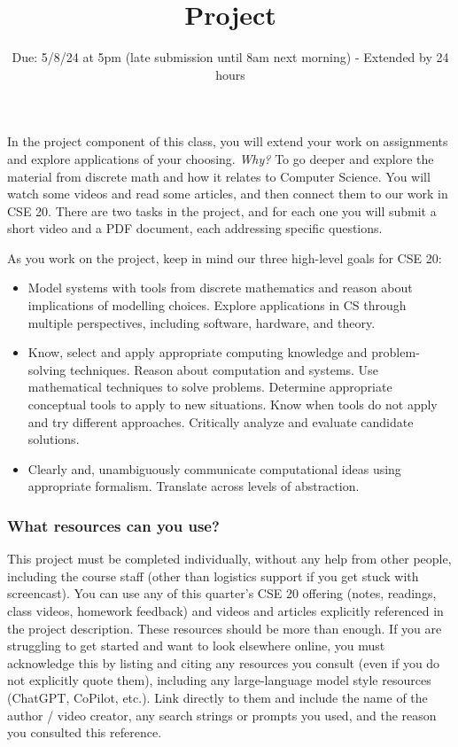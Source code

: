 \documentclass[12pt, oneside]{article}
\begin{document}
\newpage

\setlength{\parindent}{0em}
\setlength{\parskip}{0em}

\title{Project}
\date{Due: 5/8/24 at 5pm (late submission until 8am next morning) - Extended by 24 hours}


\maketitle
\thispagestyle{fancy}

\vspace{-20pt}

In the project component of this class, you will extend your 
work on assignments and explore applications of your choosing. 
{\it Why?}
To go deeper and explore the material from discrete math and how it relates to Computer Science.
You will watch some videos and read some articles, and then connect them to our work in CSE 20. There 
are two tasks in the project, and for each one you will submit a short video and a PDF document, each 
addressing specific questions.


As you work on the project, keep in mind our three high-level goals for CSE 20:
\begin{itemize}
\item Model systems with tools from discrete mathematics and reason about implications 
of modelling choices. Explore applications in CS through multiple perspectives, including software, hardware, and theory.
\item Know, select and apply appropriate computing knowledge and problem-solving techniques. Reason about computation and systems. Use mathematical techniques to solve problems. Determine appropriate conceptual tools to apply to new situations. Know when tools do not apply and try different approaches. Critically analyze and evaluate candidate solutions.
\item Clearly and, unambiguously communicate computational ideas using appropriate formalism. Translate across levels of abstraction.
\end{itemize}


\subsubsection*{What resources can you use?} This project must be completed individually, 
without any help from other people, including the course staff (other than logistics support if 
you get stuck with screencast).
You can use any of this quarter's CSE 20 offering (notes, readings, class videos, homework feedback)
and videos and articles explicitly referenced in the project description. 
These resources should be more than enough.
If you are struggling to get started and want to look elsewhere online, 
you must acknowledge this by listing and citing any resources you consult 
(even if you do not explicitly quote them), including any large-language model style resources (ChatGPT, CoPilot, etc.). 
Link directly to them and include the name of the author / video creator, 
any search strings or prompts you used, and the reason you consulted this reference.
\end{document}
